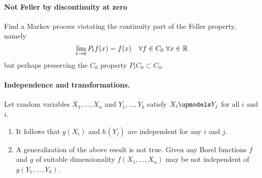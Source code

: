 \paragraph{Not Feller by discontinuity at zero}
Find a Markov process viotating the continuity part of 
the Feller property, namely
\begin{equation}
\lim_{t\to 0} P_t f(x) = f(x) \quad \forall f \in C_0 \ \forall x\in \mathbb R
\end{equation}
but perhaps preserving the $C_0$ property $P_t C_0 \subset C_0$.







\paragraph{Independence and transformations. } Let random variables
$X_1,\ldots,X_n$ and $Y_1,\ldots,Y_k$ satisfy $X_i \upmodels Y_j$ for all $i$
and $i$.
\begin{enumerate}
    \item It follows that $g(X_i)$ and $h(Y_j)$ are independent for any $i$ and
        $j$.
    \item A generalization of the above result is not true. Given any Borel
        functions $f$ and $g$ of suitable dimensionality $f(X_1,\ldots,X_n)$
        may be not independent of $g(Y_1,\ldots,Y_k)$.
\end{enumerate}


